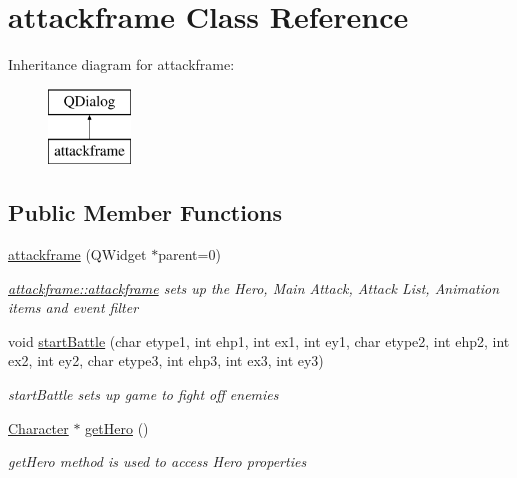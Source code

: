 \hypertarget{classattackframe}{\section{attackframe Class Reference}
\label{classattackframe}
}
Inheritance diagram for attackframe\-:\begin{figure}[H]
\begin{center}
\leavevmode
\includegraphics[height=2.000000cm]{classattackframe}
\end{center}
\end{figure}
\subsection*{Public Member Functions}
\begin{DoxyCompactItemize}
\item 
\hyperlink{classattackframe_a4093d85f3f3400f00cca4ffdb87c858d}{attackframe} (Q\-Widget $\ast$parent=0)
\begin{DoxyCompactList}\small\item\em \hyperlink{classattackframe_a4093d85f3f3400f00cca4ffdb87c858d}{attackframe\-::attackframe} sets up the Hero, Main Attack, Attack List, Animation items and event filter \end{DoxyCompactList}\item 
void \hyperlink{classattackframe_a708bc137367ff5315da0a7f62c1f8494}{start\-Battle} (char etype1, int ehp1, int ex1, int ey1, char etype2, int ehp2, int ex2, int ey2, char etype3, int ehp3, int ex3, int ey3)
\begin{DoxyCompactList}\small\item\em start\-Battle sets up game to fight off enemies \end{DoxyCompactList}\item 
\hyperlink{class_character}{Character} $\ast$ \hyperlink{classattackframe_a1806dca8de141292ba69c8d79609f8d6}{get\-Hero} ()
\begin{DoxyCompactList}\small\item\em get\-Hero method is used to access Hero properties \end{DoxyCompactList}\end{DoxyCompactItemize}
